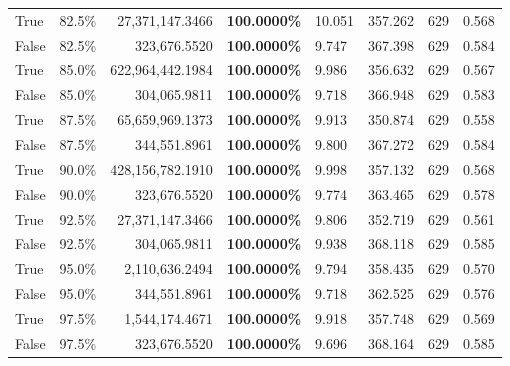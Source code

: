 \begin{table}[H]
\begin{tabular}{|m{}| m{}| r | R{0.13\textwidth}| R{0.09\textwidth}| R{0.09\textwidth}| R{0.09\textwidth}| R{0.11\textwidth}}
True & 82.5\% & 27,371,147.3466 & \bfseries \color{red} 100.0000\% & 10.051 & 357.262 & 629 & 0.568 \\
False & 82.5\% & 323,676.5520 & \bfseries \color{red} 100.0000\% & 9.747 & 367.398 & 629 & 0.584 \\
True & 85.0\% & 622,964,442.1984 & \bfseries \color{red} 100.0000\% & 9.986 & 356.632 & 629 & 0.567 \\
False & 85.0\% & \color{red} 304,065.9811 & \bfseries \color{red} 100.0000\% & 9.718 & 366.948 & 629 & 0.583 \\
True & 87.5\% & 65,659,969.1373 & \bfseries \color{red} 100.0000\% & 9.913 & 350.874 & 629 & 0.558 \\
False & 87.5\% & 344,551.8961 & \bfseries \color{red} 100.0000\% & 9.800 & 367.272 & 629 & 0.584 \\
True & 90.0\% & 428,156,782.1910 & \bfseries \color{red} 100.0000\% & 9.998 & 357.132 & 629 & 0.568 \\
False & 90.0\% & 323,676.5520 & \bfseries \color{red} 100.0000\% & 9.774 & 363.465 & 629 & 0.578 \\
True & 92.5\% & 27,371,147.3466 & \bfseries \color{red} 100.0000\% & 9.806 & 352.719 & 629 & 0.561 \\
False & 92.5\% & \color{red} 304,065.9811 & \bfseries \color{red} 100.0000\% & 9.938 & 368.118 & 629 & 0.585 \\
True & 95.0\% & 2,110,636.2494 & \bfseries \color{red} 100.0000\% & 9.794 & 358.435 & 629 & 0.570 \\
False & 95.0\% & 344,551.8961 & \bfseries \color{red} 100.0000\% & 9.718 & 362.525 & 629 & 0.576 \\
True & 97.5\% & 1,544,174.4671 & \bfseries \color{red} 100.0000\% & 9.918 & 357.748 & 629 & 0.569 \\
False & 97.5\% & 323,676.5520 & \bfseries \color{red} 100.0000\% & 9.696 & 368.164 & 629 & 0.585 \\
\bottomrule
\end{tabular}
\end{table}

